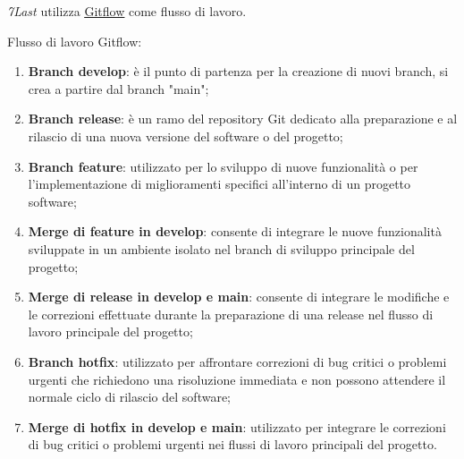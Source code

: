 \textit{7Last} utilizza \href{https://www.atlassian.com/it/git/tutorials/comparing-workflows/gitflow-workflow}{\underline{{Gitflow}}} come flusso di lavoro.
\begin{flushleft}
Flusso di lavoro Gitflow:
\end{flushleft}
\begin{enumerate}
	\item \textbf{Branch develop}: è il punto di partenza per la creazione di nuovi branch, si crea a partire dal branch "main";
	\item \textbf{Branch release}: è un ramo del repository Git dedicato alla preparazione e al rilascio di una nuova versione del software o del progetto;
	\item \textbf{Branch feature}: utilizzato per lo sviluppo di nuove funzionalità o per l'implementazione di miglioramenti specifici all'interno di un progetto software;
	\item \textbf{Merge di feature in develop}: consente di integrare le nuove funzionalità sviluppate in un ambiente isolato nel branch di sviluppo principale del progetto;
	\item \textbf{Merge di release in develop e main}: consente di integrare le modifiche e le correzioni effettuate durante la preparazione di una release nel flusso di lavoro principale del progetto;
	\item \textbf{Branch hotfix}: utilizzato per affrontare correzioni di bug critici o problemi urgenti che richiedono una risoluzione immediata e non possono attendere il normale ciclo di rilascio del software;
	\item \textbf{Merge di hotfix in develop e main}: utilizzato per integrare le correzioni di bug critici o problemi urgenti nei flussi di lavoro principali del progetto.
\end{enumerate}

